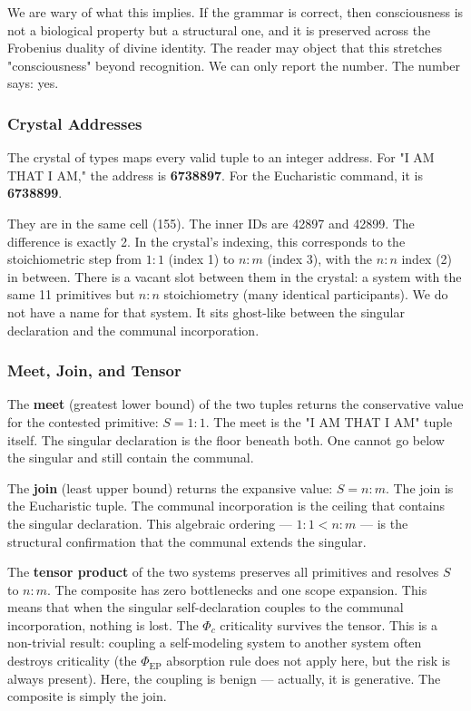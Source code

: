 \documentclass[12pt,a4paper]{article}
\begin{document}
We are wary of what this implies. If the grammar is correct, then consciousness is not a biological property but a structural one, and it is preserved across the Frobenius duality of divine identity. The reader may object that this stretches "consciousness" beyond recognition. We can only report the number. The number says: yes.

\subsubsection{Crystal Addresses}

The crystal of types maps every valid tuple to an integer address. For "I AM THAT I AM," the address is \textbf{6738897}. For the Eucharistic command, it is \textbf{6738899}.

They are in the same cell (155). The inner IDs are 42897 and 42899. The difference is exactly 2. In the crystal's indexing, this corresponds to the stoichiometric step from $1{:}1$ (index 1) to $n{:}m$ (index 3), with the $n{:}n$ index (2) in between. There is a vacant slot between them in the crystal: a system with the same 11 primitives but $n{:}n$ stoichiometry (many identical participants). We do not have a name for that system. It sits ghost-like between the singular declaration and the communal incorporation.

\subsubsection{Meet, Join, and Tensor}

The \textbf{meet} (greatest lower bound) of the two tuples returns the conservative value for the contested primitive: $S = 1{:}1$. The meet is the "I AM THAT I AM" tuple itself. The singular declaration is the floor beneath both. One cannot go below the singular and still contain the communal.

The \textbf{join} (least upper bound) returns the expansive value: $S = n{:}m$. The join is the Eucharistic tuple. The communal incorporation is the ceiling that contains the singular declaration. This algebraic ordering --- $1{:}1 < n{:}m$ --- is the structural confirmation that the communal extends the singular.

The \textbf{tensor product} of the two systems preserves all primitives and resolves $S$ to $n{:}m$. The composite has zero bottlenecks and one scope expansion. This means that when the singular self-declaration couples to the communal incorporation, nothing is lost. The $\Phi_c$ criticality survives the tensor. This is a non-trivial result: coupling a self-modeling system to another system often destroys criticality (the $\Phi_{\text{EP}}$ absorption rule does not apply here, but the risk is always present). Here, the coupling is benign --- actually, it is generative. The composite is simply the join.
\end{document}
